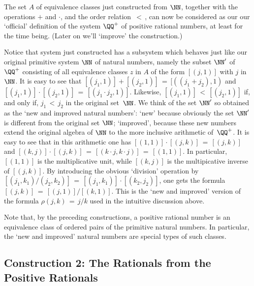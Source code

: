 
        The set $A$ of equivalence classes just constructed from ${\NN}$, together with the operations $+$ and ${\cdot}$, and the order relation $\,<\,$,
    can now  be considered as our our `official' definition of the system ${\QQ}^{+}$ of positive rational numbers, at least for the time being.
    (Later on we'll `improve' the construction.)

        Notice that system just constructed has a subsystem which behaves just like our original primitive system ${\NN}$ of natural numbers,
    namely the subset ${\NN}'$ of ${\QQ}^{+}$ consisting of all equivalence classes $z$ in $A$ of the form $[(j,1)]$ with $j$ in ${\NN}$.
    It is easy to see that $[(j_{1},1)] + [(j_{2},1)] \,=\, [((j_{1}+j_{2}),1)$ and $[(j_{1},1)]{\cdot}[(j_{2},1)] \,=\, [(j_{1}{\cdot}j_{2},1)]$.
    Likewise, $[(j_{1},1)]\,<\,[(j_{2},1)]$ if, and only if, $j_{1}\,<\,j_{2}$ in the original set~${\NN}$.
    We think of the set ${\NN}'$ so obtained as the `new and improved natural numbers':
    `new' because obviously the set ${\NN}'$ is different from the original set ${\NN}$;
    `improved', because these new numbers extend the original algebra of ${\NN}$ to the more inclusive arithmetic of~${\QQ}^{+}$.
    It is easy to see that in this arithmetic one has $[(1,1)]{\cdot}[(j,k)] \,=\, [(j,k)]$
    and $[(k,j)]{\cdot}[(j,k)] \,=\, [(k{\cdot}j,k{\cdot}j)] \,=\, [(1,1)]$. In particular,
    $[(1,1)]$ is the multiplicative unit, while $[(k,j)]$ is the multipicative inverse of $[(j,k)]$.
    By introducing the obvious `division' operation by $[(j_{1},k_{1})/(j_{2},k_{2})] \,=\, [(j_{1},k_{1})]{\cdot}[(k_{2},j_{2})]$,
    one gets the formula $[(j,k)] \,=\, [(j,1)]/[(k,1)]$. This is the `new and improved'
    version of the formula ${\rho}(j,k) \,=\, j/k$ used in the intuitive discussion above.

        Note that, by the preceding constructions, a positive rational number is an equivalence class of ordered pairs of the primitive natural numbers.
    In particular, the `new and improved' natural numbers are special types of such classes.



        \subsection{\small{{\bf Construction 2: The Rationals from the Positive Rationals}}}
                \label{ConstA50.130B}


